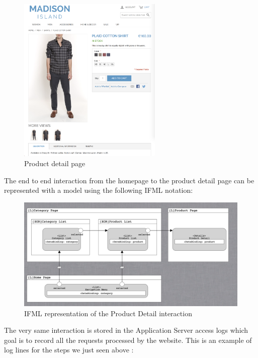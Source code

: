 \vspace{0.1cm}
\begin{figure}[htbp]
  \centering
    \includegraphics[height=8cm]{images/madison/product-detail.png}
  \caption{Product detail page}
  \label{fig:product-detail}
\end{figure}
\vspace{0.1cm}

The end to end interaction from the homepage to the product detail page can be represented with a model using the following IFML notation:

\vspace{0.1cm}
\begin{figure}[htbp]
  \centering
    \includegraphics[width=12cm]{images/madison/ifml1.png}
  \caption{IFML representation of the Product Detail interaction}
  \label{fig:ifml1}
\end{figure}
\vspace{0.1cm}

The very same interaction is stored in the Application Server access logs which goal is to record all the requests processed by the website. This is an example of log lines for the steps we just seen above :

